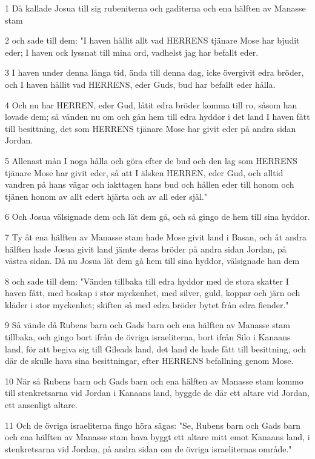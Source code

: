 \par 1 Då kallade Josua till sig rubeniterna och gaditerna och ena hälften av Manasse stam
\par 2 och sade till dem: "I haven hållit allt vad HERRENS tjänare Mose har bjudit eder; I haven ock lyssnat till mina ord, vadhelst jag har befallt eder.
\par 3 I haven under denna långa tid, ända till denna dag, icke övergivit edra bröder, och I haven hållit vad HERRENS, eder Guds, bud har befallt eder hålla.
\par 4 Och nu har HERREN, eder Gud, låtit edra bröder komma till ro, såsom han lovade dem; så vänden nu om och gån hem till edra hyddor i det land I haven fått till besittning, det som HERRENS tjänare Mose har givit eder på andra sidan Jordan.
\par 5 Allenast mån I noga hålla och göra efter de bud och den lag som HERRENS tjänare Mose har givit eder, så att I älsken HERREN, eder Gud, och alltid vandren på hans vägar och iakttagen hans bud och hållen eder till honom och tjänen honom av allt edert hjärta och av all eder själ."
\par 6 Och Josua välsignade dem och lät dem gå, och så gingo de hem till sina hyddor.
\par 7 Ty åt ena hälften av Manasse stam hade Mose givit land i Basan, och åt andra hälften hade Josua givit land jämte deras bröder på andra sidan Jordan, på västra sidan. Då nu Josua lät dem gå hem till sina hyddor, välsignade han dem
\par 8 och sade till dem: "Vänden tillbaka till edra hyddor med de stora skatter I haven fått, med boskap i stor myckenhet, med silver, guld, koppar och järn och kläder i stor myckenhet; skiften så med edra bröder bytet från edra fiender."
\par 9 Så vände då Rubens barn och Gads barn och ena hälften av Manasse stam tillbaka, och gingo bort ifrån de övriga israeliterna, bort ifrån Silo i Kanaans land, för att begiva sig till Gileads land, det land de hade fått till besittning, och där de skulle hava sina besittningar, efter HERRENS befallning genom Mose.
\par 10 När så Rubens barn och Gads barn och ena hälften av Manasse stam kommo till stenkretsarna vid Jordan i Kanaans land, byggde de där ett altare vid Jordan, ett ansenligt altare.
\par 11 Och de övriga israeliterna fingo höra sägas: "Se, Rubens barn och Gads barn och ena hälften av Manasse stam hava byggt ett altare mitt emot Kanaans land, i stenkretsarna vid Jordan, på andra sidan om de övriga israeliternas område."

